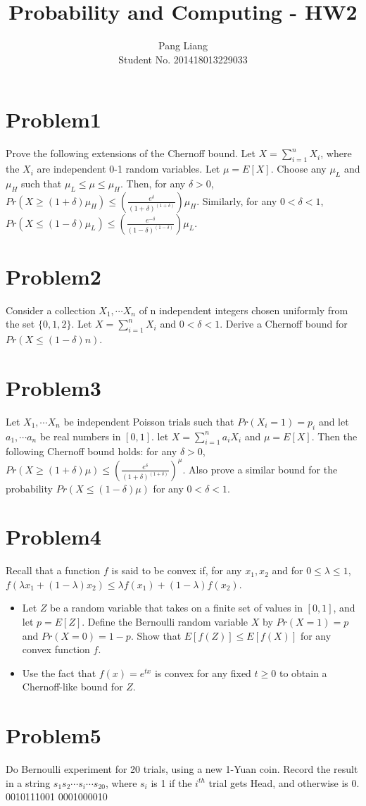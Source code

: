 \documentclass[12pt]{article}
\title{Probability and Computing - HW2}
\author{Pang Liang\\ Student No. 201418013229033}
\begin{document}
\maketitle

\section{Problem1}
Prove the following extensions of the Chernoff bound. Let $X=\sum_{i=1}^{n} X_i$, where the $X_i$ are independent 0-1 random variables. Let $\mu = E[X]$. Choose any $\mu_L$ and $\mu_H$ such that $\mu_L \le \mu \le \mu_H$. Then, for any $\delta > 0$, $Pr(X \ge (1+\delta) \mu_H) \le (\frac{e^\delta}{(1+\delta)^{(1+\delta)}}) \mu_H$.
Similarly, for any $0 < \delta < 1$, $Pr(X \le (1-\delta) \mu_L) \le (\frac{e^{-\delta}}{(1-\delta)^{(1-\delta)}}) \mu_L$.\\



\section{Problem2}
Consider a collection $X_1, \cdots X_n$ of n independent integers chosen uniformly from the set $\{0,1,2\}$. Let $X=\sum_{i=1}^{n}X_i$ and $0 < \delta < 1$. Derive a Chernoff bound for $Pr(X \le (1-\delta)n)$.\\

\section{Problem3}
Let $X_1, \cdots X_n$ be independent Poisson trials such that $Pr(X_i = 1) = p_i$ and let $a_1, \cdots a_n$ be real numbers in $[0, 1]$. let $X = \sum_{i=1}^{n} a_iX_i$ and $\mu = E[X]$. Then the following Chernoff bound holds: for any $\delta > 0$, $Pr(X \ge (1+\delta) \mu) \le (\frac{e^\delta}{(1+\delta)^{(1+\delta)}})^\mu$. Also prove a similar bound for the probability $Pr(X \le (1-\delta)\mu)$ for any $0 < \delta < 1$.\\

\section{Problem4}
Recall that a function $f$ is said to be convex if, for any $x_1, x_2$ and for $0 \le \lambda \le 1$, $f(\lambda x_1 + (1-\lambda) x_2) \le \lambda f(x_1)+ (1-\lambda) f(x_2)$.
\begin{itemize}
    \item Let $Z$ be a random variable that takes on a finite set of values in $[0, 1]$, and let $p = E[Z]$. Define the Bernoulli random variable $X$ by $Pr(X = 1) = p$ and $Pr(X = 0) = 1-p$. Show that $E[f(Z)] \le E[f(X)]$ for any convex function $f$. 
    \item Use the fact that $f(x) = e^{tx}$ is convex for any fixed $t \ge 0$ to obtain a Chernoff-like bound for $Z$.\\
\end{itemize}

\section{Problem5}
Do Bernoulli experiment for 20 trials, using a new 1-Yuan coin. Record the result in a string $s_1s_2 \cdots s_i \cdots s_{20}$, where $s_i$ is 1 if the $i^{th}$ trial gets Head, and otherwise is 0.\\

0010111001 0001000010
\end{document}
